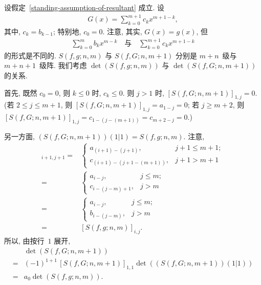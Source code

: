 \documentclass[../libro.tex]{subfiles}
\begin{document}
\begin{example}
    设假定~\ref{standing-assumption-of-resultant} 成立.
    设
    \begin{align*}
        G(x) = \sum_{k = 0}^{m+1} {c_k x^{m+1-k}},
    \end{align*}
    其中, \(c_k = b_{k-1}\);
    特别地, \(c_0 = 0\).
    注意, 其实, \(G(x) = g(x)\),
    但
    \begin{align*}
        \sum_{k = 0}^{m} {b_k x^{m-k}}
        \quad \text{与} \quad
        \sum_{k = 0}^{m+1} {c_k x^{m+1-k}}
    \end{align*}
    的形式是不同的.
    \(S(f, g; n, m)\) 与 \(S(f, G; n, m+1)\)
    分别是 \(m+n\)~级与 \(m+n+1\)~级阵.
    我们考虑 \(\det {(S(f, g; n, m))}\)
    与 \(\det {(S(f, G; n, m+1))}\)
    的关系.

    首先, 既然 \(c_0 = 0\),
    则 \(k \leq 0\) 时, \(c_k \leq 0\).
    则 \(j > 1\) 时, \([S(f, G; n, m+1)]_{1,j} = 0\).
    (若 \(2 \leq j \leq m+1\), %
    则 \([S(f, G; n, m+1)]_{1,j} = a_{1-j} = 0\);
    若 \(j \geq m+2\), 则
    \([S(f, G; n, m+1)]_{1,j} %
    = c_{1-(j-(m+1))} = c_{m+2-j} = 0\).) %

    另一方面,
    \((S(f, G; n, m+1))(1|1) = S(f, g; n, m)\).
    注意,
    \begin{align*}
        [S(f, G; n, m+1)]_{i+1,j+1}
        = {} &
        \begin{cases}
            a_{(i+1)-(j+1)},       & j+1 \leq m+1; \\
            c_{(i+1)-(j+1-(m+1))}, & j+1 > m+1
        \end{cases}
        \\
        = {} &
        \begin{cases}
            a_{i-j},       & j \leq m; \\
            c_{i-(j-m)+1}, & j > m
        \end{cases}
        \\
        = {} &
        \begin{cases}
            a_{i-j},     & j \leq m; \\
            b_{i-(j-m)}, & j > m
        \end{cases}
        \\
        = {} &
        [S(f, g; n, m)]_{i,j}.
    \end{align*}
    所以, 由按行~\(1\) 展开,
    \begin{align*}
        &
        \det {(S(f, G; n, m+1))}
        \\
        = {} &
        (-1)^{1+1}\, [S(f, G; n, m+1)]_{1,1}
        \det {((S(f, G; n, m+1))(1|1))}
        \\
        = {} &
        a_0 \det {(S(f, g; n, m))}.
    \end{align*}


\end{example}
\end{document}
